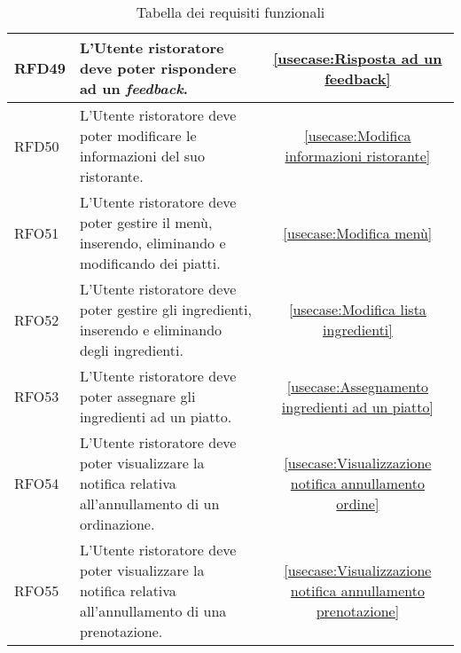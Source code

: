 \begin{table}[H]
\begin{tabularx}{\textwidth}{l|X|c}
		\hline
		RFD49       & L'Utente ristoratore deve poter rispondere ad un \textit{feedback}.                                                     & \autoref{usecase:Risposta ad un feedback}                            \\
		\hline
		RFD50       & L'Utente ristoratore deve poter modificare le informazioni del suo ristorante.                                          & \autoref{usecase:Modifica informazioni ristorante}                   \\
		\hline
		RFO51       & L'Utente ristoratore deve poter gestire il menù, inserendo, eliminando e modificando dei piatti.                        & \autoref{usecase:Modifica menù}                                      \\
		\hline
		RFO52       & L'Utente ristoratore deve poter gestire gli ingredienti, inserendo e eliminando degli ingredienti.                      & \autoref{usecase:Modifica lista ingredienti}                         \\
		\hline
		RFO53       & L'Utente ristoratore deve poter assegnare gli ingredienti ad un piatto.                                                 & \autoref{usecase:Assegnamento ingredienti ad un piatto}              \\
		\hline
		RFO54       & L'Utente ristoratore deve poter visualizzare la notifica relativa all'annullamento di un ordinazione.                   & \autoref{usecase:Visualizzazione notifica annullamento ordine}       \\
		\hline
		RFO55       & L'Utente ristoratore deve poter visualizzare la notifica relativa all'annullamento di una prenotazione.                 & \autoref{usecase:Visualizzazione notifica annullamento prenotazione} \\
		\end{tabularx}
	\caption{Tabella dei requisiti funzionali}
\end{table}

